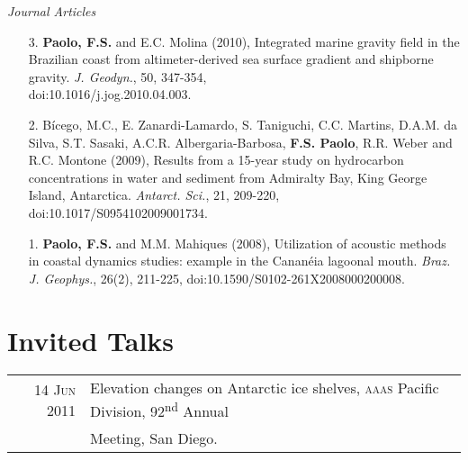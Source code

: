 \documentclass[a4paper,11pt]{article}
\begin{document}
\emph{Journal Articles}

\begin{enumerate}
  \item [3.] {\bf Paolo, F.S.} and E.C. Molina (2010), Integrated marine 
        gravity field in the Brazilian coast from altimeter-derived sea 
        surface gradient and shipborne gravity. {\it J. Geodyn.}, 50, 347-354,\\
        doi:10.1016/j.jog.2010.04.003.
  \item [2.] B\'icego, M.C., E. Zanardi-Lamardo, S. Taniguchi, C.C. Martins, 
        D.A.M. da Silva, S.T. Sasaki, A.C.R. Albergaria-Barbosa, {\bf F.S. 
        Paolo}, R.R. Weber and R.C. Montone (2009), Results from a 15-year 
        study on hydrocarbon concentrations in water and sediment from 
        Admiralty Bay, King George Island, Antarctica. {\it Antarct. Sci.}, 
        21, 209-220, doi:10.1017/S0954102009001734.
  \item [1.] {\bf Paolo, F.S.} and M.M. Mahiques (2008), Utilization of 
        acoustic methods in coastal dynamics studies: example in the 
        Canan\'eia lagoonal mouth. {\it Braz. J. Geophys.}, 26(2), 211-225, 
        doi:10.1590/S0102-261X2008000200008.
\end{enumerate}


\section{Invited Talks}

\begin{tabular}{rl}
14 \textsc{Jun} 2011 & Elevation changes on Antarctic ice shelves, \textsc{aaas} Pacific Division, 92\textsuperscript{nd} Annual\\ 
& Meeting, San Diego.
\end{tabular}

\end{document}
